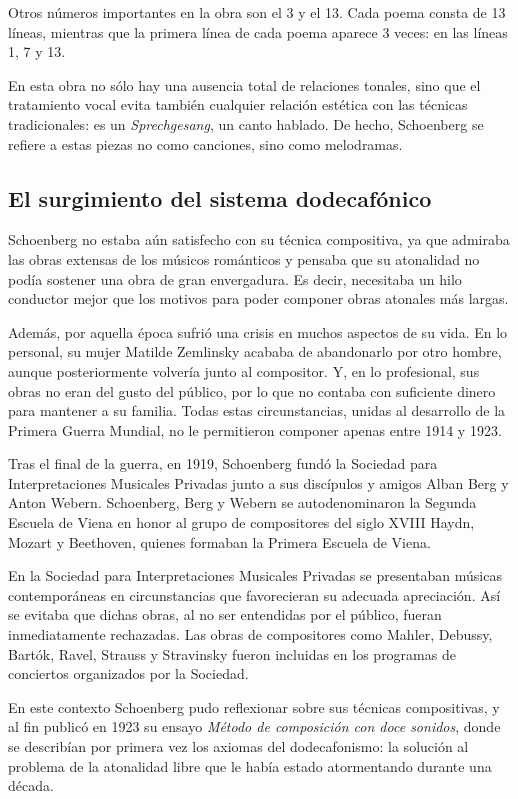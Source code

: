 Otros números importantes en la obra son el 3 y el 13. Cada poema consta de 13 líneas, mientras que la primera línea de cada poema aparece 3 veces: en las líneas 1, 7 y 13.

En esta obra no sólo hay una ausencia total de relaciones tonales, sino que el tratamiento vocal evita también cualquier relación estética con las técnicas tradicionales: es un \emph{Sprechgesang}, un canto hablado. De hecho, Schoenberg se refiere a estas piezas no como canciones, sino como melodramas.
%
\cite{diaz}

\subsection{El surgimiento del sistema dodecafónico}
Schoenberg no estaba aún satisfecho con su técnica compositiva, ya que admiraba las obras extensas de los músicos románticos y pensaba que su atonalidad no podía sostener una obra de gran envergadura. Es decir, necesitaba un hilo conductor mejor que los motivos para poder componer obras atonales más largas.

Además, por aquella época sufrió una crisis en muchos aspectos de su vida. En lo personal, su mujer Matilde Zemlinsky acababa de abandonarlo por otro hombre, aunque posteriormente volvería junto al compositor. Y, en lo profesional, sus obras no eran del gusto del público, por lo que no contaba con suficiente dinero para mantener a su familia. Todas estas circunstancias, unidas al desarrollo de la Primera Guerra Mundial, no le permitieron componer apenas entre 1914 y 1923.

Tras el final de la guerra, en 1919, Schoenberg fundó la Sociedad para Interpretaciones Musicales Privadas junto a sus discípulos y amigos Alban Berg y Anton Webern. Schoenberg, Berg y Webern se autodenominaron la Segunda Escuela de Viena en honor al grupo de compositores del siglo XVIII Haydn, Mozart y Beethoven, quienes formaban la Primera Escuela de Viena.

En la Sociedad para Interpretaciones Musicales Privadas se presentaban músicas contemporáneas en circunstancias que favorecieran su adecuada apreciación. Así se evitaba que dichas obras, al no ser entendidas por el público, fueran inmediatamente rechazadas. Las obras de compositores como Mahler, Debussy, Bartók, Ravel, Strauss y Stravinsky fueron incluidas en los programas de conciertos organizados por la Sociedad.

En este contexto Schoenberg pudo reflexionar sobre sus técnicas compositivas, y al fin publicó en 1923 su ensayo \emph{Método de composición con doce sonidos}, donde se describían por primera vez los axiomas del dodecafonismo: la solución al problema de la atonalidad libre que le había estado atormentando durante una década.

